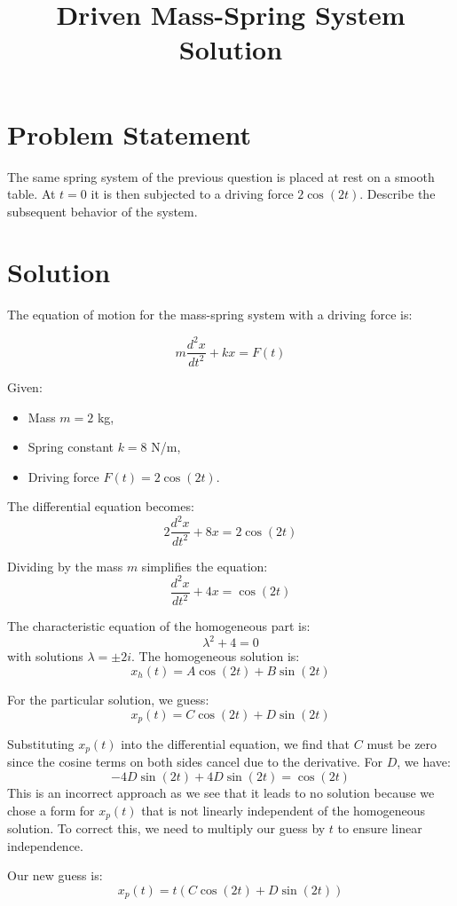\documentclass{article}
\begin{document}
\title{Driven Mass-Spring System Solution}
\date{}
\maketitle

\section*{Problem Statement}
The same spring system of the previous question is placed at rest on a smooth table. At \( t = 0 \) it is then subjected to a driving force \( 2\cos(2t) \). Describe the subsequent behavior of the system.

\section*{Solution}
The equation of motion for the mass-spring system with a driving force is:

\[ m\frac{d^2x}{dt^2} + kx = F(t) \]

Given:
\begin{itemize}
    \item Mass \( m = 2 \) kg,
    \item Spring constant \( k = 8 \) N/m,
    \item Driving force \( F(t) = 2\cos(2t) \).
\end{itemize}

The differential equation becomes:
\[ 2\frac{d^2x}{dt^2} + 8x = 2\cos(2t) \]

Dividing by the mass \( m \) simplifies the equation:
\[ \frac{d^2x}{dt^2} + 4x = \cos(2t) \]

The characteristic equation of the homogeneous part is:
\[ \lambda^2 + 4 = 0 \]
with solutions \( \lambda = \pm 2i \). The homogeneous solution is:
\[ x_h(t) = A\cos(2t) + B\sin(2t) \]

For the particular solution, we guess:
\[ x_p(t) = C\cos(2t) + D\sin(2t) \]

Substituting \( x_p(t) \) into the differential equation, we find that \( C \) must be zero since the cosine terms on both sides cancel due to the derivative. For \( D \), we have:
\[ -4D\sin(2t) + 4D\sin(2t) = \cos(2t) \]
This is an incorrect approach as we see that it leads to no solution because we chose a form for \( x_p(t) \) that is not linearly independent of the homogeneous solution. To correct this, we need to multiply our guess by \( t \) to ensure linear independence.

Our new guess is:
\[ x_p(t) = t(C\cos(2t) + D\sin(2t)) \]
\end{document}
